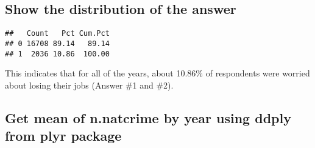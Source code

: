 \documentclass[]{article}
\newenvironment{Shaded}{\begin{snugshade}}{\end{snugshade}}
\newcommand{\CommentTok}[1]{\textcolor[rgb]{0.56,0.35,0.01}{\textit{#1}}}
\newcommand{\DecValTok}[1]{\textcolor[rgb]{0.00,0.00,0.81}{#1}}
\newcommand{\KeywordTok}[1]{\textcolor[rgb]{0.13,0.29,0.53}{\textbf{#1}}}
\newcommand{\NormalTok}[1]{#1}
\newcommand{\OperatorTok}[1]{\textcolor[rgb]{0.81,0.36,0.00}{\textbf{#1}}}
\newcommand{\StringTok}[1]{\textcolor[rgb]{0.31,0.60,0.02}{#1}}
\begin{document}
\begin{Shaded}
\end{Shaded}

\hypertarget{show-the-distribution-of-the-answer}{%
\subsection{Show the distribution of the
answer}\label{show-the-distribution-of-the-answer}}

\begin{Shaded}
\end{Shaded}

\begin{verbatim}
##   Count   Pct Cum.Pct
## 0 16708 89.14   89.14
## 1  2036 10.86  100.00
\end{verbatim}

This indicates that for all of the years, about 10.86\% of respondents
were worried about losing their jobs (Answer \#1 and \#2).

\hypertarget{get-mean-of-n.natcrime-by-year-using-ddply-from-plyr-package}{%
\subsection{Get mean of n.natcrime by year using ddply from plyr
package}\label{get-mean-of-n.natcrime-by-year-using-ddply-from-plyr-package}}
\end{document}
